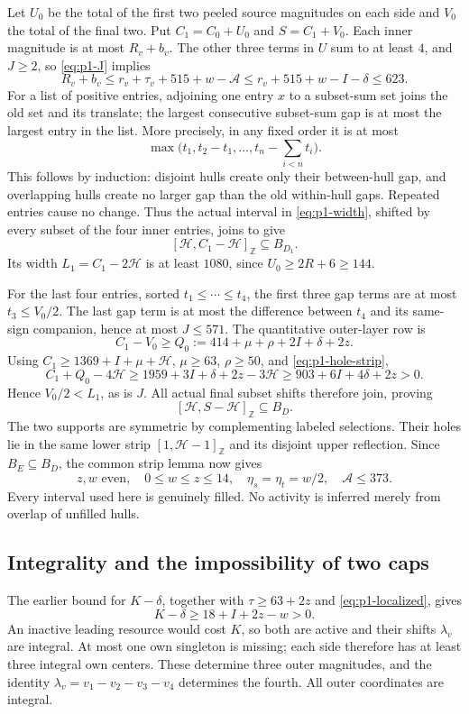 \documentclass[11pt,letterpaper]{article}
\newcommand{\Z}{\mathbb Z}\newcommand{\R}{\mathbb R}
\theoremstyle{definition}\newtheorem{definition}[theorem]{Definition}
\begin{document}
Let $U_0$ be the total of the first two peeled source magnitudes on each side and $V_0$ the total of the final two. Put $C_1=C_0+U_0$ and $S=C_1+V_0$. Each inner magnitude is at most $R_v+b_v$. The other three terms in $U$ sum to at least $4$, and $J\ge2$, so \eqref{eq:p1-J} implies
\[
R_v+b_v\le r_v+\tau_v+515+w-\mathcal A
\le r_v+515+w-I-\delta\le623.
\]
For a list of positive entries, adjoining one entry $x$ to a subset-sum set joins the old set and its translate; the largest consecutive subset-sum gap is at most the largest entry in the list. More precisely, in any fixed order it is at most
\[
\max\bigl(t_1,t_2-t_1,\ldots,t_n-\textstyle\sum_{i<n}t_i\bigr).
\]
This follows by induction: disjoint hulls create only their between-hull gap, and overlapping hulls create no larger gap than the old within-hull gaps. Repeated entries cause no change. Thus the actual interval in \eqref{eq:p1-width}, shifted by every subset of the four inner entries, joins to give
\[
[\mathcal H,C_1-\mathcal H]_{\Z}\subseteq B_{D_1}.
\]
Its width $L_1=C_1-2\mathcal H$ is at least $1080$, since $U_0\ge2R+6\ge144$.

For the last four entries, sorted $t_1\le\cdots\le t_4$, the first three gap terms are at most $t_3\le V_0/2$. The last gap term is at most the difference between $t_4$ and its same-sign companion, hence at most $J\le571$. The quantitative outer-layer row is
\[
C_1-V_0\ge Q_0:=414+\mu+\rho+2I+\delta+2z.
\]
Using $C_1\ge1369+I+\mu+\mathcal H$, $\mu\ge63$, $\rho\ge50$, and \eqref{eq:p1-hole-strip},
\[
C_1+Q_0-4\mathcal H
\ge1959+3I+\delta+2z-3\mathcal H
\ge903+6I+4\delta+2z>0.
\]
Hence $V_0/2<L_1$, as is $J$. All actual final subset shifts therefore join, proving
\[
[\mathcal H,S-\mathcal H]_{\Z}\subseteq B_D.
\]
The two supports are symmetric by complementing labeled selections. Their holes lie in the same lower strip $[1,\mathcal H-1]_{\Z}$ and its disjoint upper reflection. Since $B_E\subseteq B_D$, the common strip lemma now gives
\begin{equation}\label{eq:p1-localized}
z,w\text{ even},\quad0\le w\le z\le14,\quad
\eta_s=\eta_t=w/2,\quad \mathcal A\le373.
\end{equation}
Every interval used here is genuinely filled. No activity is inferred merely from overlap of unfilled hulls.

\subsection{Integrality and the impossibility of two caps}
The earlier bound for $K-\delta$, together with $\tau\ge63+2z$ and \eqref{eq:p1-localized}, gives
\[
K-\delta\ge18+I+2z-w>0.
\]
An inactive leading resource would cost $K$, so both are active and their shifts $\lambda_v$ are integral. At most one own singleton is missing; each side therefore has at least three integral own centers. These determine three outer magnitudes, and the identity $\lambda_v=v_1-v_2-v_3-v_4$ determines the fourth. All outer coordinates are integral.
\end{document}
